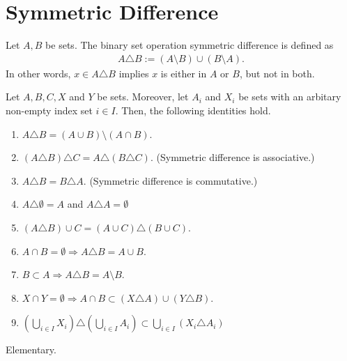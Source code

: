\section{Symmetric Difference}
\begin{definition}
    Let {\color{mathif}\(A, B\)} be {\color{mathif}sets}. The binary set operation {\color{maththen}symmetric difference} is defined as
    \begin{align}
        A \triangle B := (A \setminus B) \cup (B \setminus A) \text{.}
    \end{align}
    In other words, \(x \in A \triangle B\) implies \(x\) is either in \(A\) or \(B\), but not in both.
\end{definition}
\begin{proposition}
    Let \(A, B, C, X\) and \(Y\) be {\color{mathif}sets}. Moreover, let \(A_i\) and \(X_i\) be {\color{mathif}sets} with an {\color{mathif}arbitary non-empty index set} \(i \in I\). Then, the following {\color{maththen}identities} hold.
    \begin{enumerate}
        \item \( A \triangle B = (A \cup B) \setminus (A \cap B) \).
        \item \( ( A \triangle B) \triangle C = A \triangle (B \triangle C) \). (Symmetric difference is {\color{mathrem}associative}.) 
        \item \( A \triangle B = B \triangle A \). (Symmetric difference is {\color{mathrem}commutative}.)
        \item \( A \triangle \emptyset = A\) and \( A \triangle A = \emptyset\)
        \item \( (A \triangle B) \cup C = (A \cup C) \triangle (B \cup C)\).
        \item \( A \cap B = \emptyset \Rightarrow A \triangle B = A \cup B \).
        \item \( B \subset A \Rightarrow A \triangle B = A \setminus B \).
        \item \(X \cap Y = \emptyset \Rightarrow A \cap B \subset (X \triangle A) \cup (Y \triangle B) \).
        \item \( (\bigcup_{i \in I} X_i) \triangle (\bigcup_{i \in I} A_i) \subset \bigcup_{i \in I} (X_i \triangle A_i) \)
    \end{enumerate}
\end{proposition}
\begin{Proof}
    Elementary.
\end{Proof}
%
%
%
%
%
